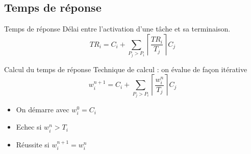 \subsection{Temps de réponse}

\begin{frame}{Temps de réponse}
  Délai entre l'activation d'une tâche et sa terminaison. 
  $$TR_i = C_i + \sum_{P_j > P_i} \left\lceil\frac{TR_i}{T_j}\right\rceil C_j$$
\end{frame}

\begin{frame}{Calcul du temps de réponse}
  Technique de calcul : on évalue de façon itérative
  $$w_i^{n+1}=C_i+\sum_{P_j > P_i} \left\lceil\frac{w_i^n}{T_j}\right\rceil C_j$$

  \begin{itemize}
    \item On démarre avec $w_i^0 = C_i$
    \item Echec si $w_i^n > T_i$
    \item Réussite si $w_i^{n+1} = w_i^n$
  \end{itemize}
\end{frame} 


